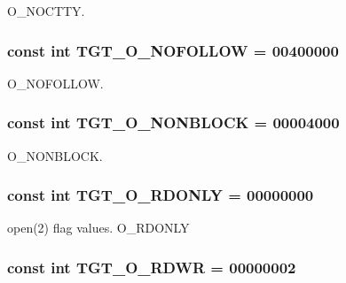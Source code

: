 O\_\-NOCTTY. \hypertarget{classArmLinux64_a9c27f68ab31ddfdd3e35800ea1f02a89}{
\subsubsection[{TGT\_\-O\_\-NOFOLLOW}]{\setlength{\rightskip}{0pt plus 5cm}const int {\bf TGT\_\-O\_\-NOFOLLOW} = 00400000}}
\label{classArmLinux64_a9c27f68ab31ddfdd3e35800ea1f02a89}


O\_\-NOFOLLOW. \hypertarget{classArmLinux64_a0ea5420b4c9b45ba342a266fb77ac942}{
\subsubsection[{TGT\_\-O\_\-NONBLOCK}]{\setlength{\rightskip}{0pt plus 5cm}const int {\bf TGT\_\-O\_\-NONBLOCK} = 00004000}}
\label{classArmLinux64_a0ea5420b4c9b45ba342a266fb77ac942}


O\_\-NONBLOCK. \hypertarget{classArmLinux64_ad266b23a0ae07d1833e18bae651f3411}{
\subsubsection[{TGT\_\-O\_\-RDONLY}]{\setlength{\rightskip}{0pt plus 5cm}const int {\bf TGT\_\-O\_\-RDONLY} = 00000000}}
\label{classArmLinux64_ad266b23a0ae07d1833e18bae651f3411}


open(2) flag values. O\_\-RDONLY \hypertarget{classArmLinux64_ac6fa9ecf5d2f3314f197698f1099e2ac}{
\subsubsection[{TGT\_\-O\_\-RDWR}]{\setlength{\rightskip}{0pt plus 5cm}const int {\bf TGT\_\-O\_\-RDWR} = 00000002}}
\label{classArmLinux64_ac6fa9ecf5d2f3314f197698f1099e2ac}


